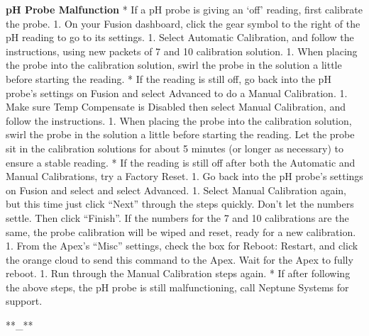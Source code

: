 \documentclass[]{book}
\begin{document}
 \textbf{pH Probe Malfunction} * If a pH probe is giving an `off'
reading, first calibrate the probe. 1. On your Fusion dashboard, click
the gear symbol to the right of the pH reading to go to its settings. 1.
Select Automatic Calibration, and follow the instructions, using new
packets of 7 and 10 calibration solution. 1. When placing the probe into
the calibration solution, swirl the probe in the solution a little
before starting the reading. * If the reading is still off, go back into
the pH probe's settings on Fusion and select Advanced to do a Manual
Calibration. 1. Make sure Temp Compensate is Disabled then select Manual
Calibration, and follow the instructions. 1. When placing the probe into
the calibration solution, swirl the probe in the solution a little
before starting the reading. Let the probe sit in the calibration
solutions for about 5 minutes (or longer as necessary) to ensure a
stable reading. * If the reading is still off after both the Automatic
and Manual Calibrations, try a Factory Reset. 1. Go back into the pH
probe's settings on Fusion and select and select Advanced. 1. Select
Manual Calibration again, but this time just click ``Next'' through the
steps quickly. Don't let the numbers settle. Then click ``Finish''. If
the numbers for the 7 and 10 calibrations are the same, the probe
calibration will be wiped and reset, ready for a new calibration. 1.
From the Apex's ``Misc'' settings, check the box for Reboot: Restart,
and click the orange cloud to send this command to the Apex. Wait for
the Apex to fully reboot. 1. Run through the Manual Calibration steps
again. * If after following the above steps, the pH probe is still
malfunctioning, call Neptune Systems for support.

 **\_**


\end{document}
